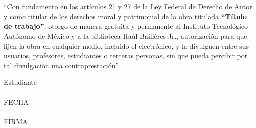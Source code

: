 \section*{\phantom{Declaración}}
``Con fundamento en los artículos 21 y 27 de la Ley Federal de Derecho de Autor
y como titular de los derechos moral y patrimonial de la obra titulada
\textbf{``Título de trabajo''}, otorgo de manera gratuita y permanente al
Instituto Tecnológico Autónomo de México y a la biblioteca Raúl Baillères Jr.,
autorización para que fijen la obra en cualquier medio, incluido el electrónico,
y la divulguen entre sus usuarios, profesores, estudiantes o terceras personas,
sin que pueda percibir por tal divulgación una contraprestación'' \vspace{2em}
\\ \begin{center} \vspace{2em}
    {Estudiante } \\
    \phantom{espacio} \vspace{5em}
    \underline{ }\\
    \small{FECHA}      \\
    \phantom{espacio} \vspace{5em}
    \underline{ }\\
    \small{FIRMA}
      \end{center}
